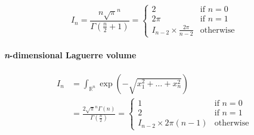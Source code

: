\documentclass{scrartcl}
\begin{document}
\[
I_n
= \frac{n \sqrt{\pi}^n}{\Gamma(\frac{n}{2}+1)}
= \begin{cases}
  2&\text{if $n = 0$}\\
  2\pi&\text{if $n = 1$}\\
  I_{n-2} \times \frac{2\pi}{n - 2}&\text{otherwise}
\end{cases}
\]


\paragraph{\textit{n}-dimensional Laguerre volume}

\begin{equation}\label{ndimlaguerre}
  \begin{split}
  I_n
  &= \int_{\mathbb{R}^n} \exp\left(-\sqrt{x_1^2+\dots+x_n^2}\right)\\
  &= \frac{2 \sqrt{\pi}^n \Gamma(n)}{\Gamma(\frac{n}{2})}
  = \begin{cases}
    1&\text{if $n=0$}\\
    2&\text{if $n=1$}\\
    I_{n-2} \times 2\pi(n-1)&\text{otherwise}
  \end{cases}
  \end{split}
\end{equation}
\end{document}
